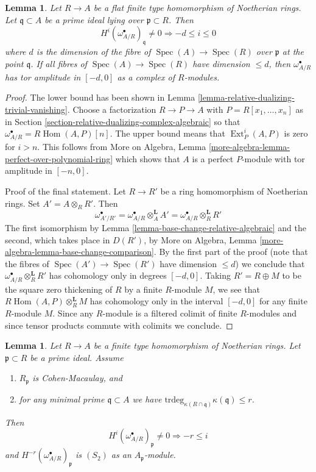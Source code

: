 \documentclass{stacks-project}
\theoremstyle{plain}
\newtheorem{lemma}[subsection]{Lemma}
\theoremstyle{definition}
\theoremstyle{remark}
\numberwithin{equation}{subsection}
\def\Spec{\mathop{\mathrm{Spec}}}
\def\Hom{\mathop{\mathrm{Hom}}\nolimits}
\def\Ext{\mathop{\mathrm{Ext}}\nolimits}
\begin{document}
\begin{lemma}
\label{lemma-relative-dualizing-flat-vanishing}
Let $R \to A$ be a flat finite type homomorphism of Noetherian rings.
Let $\mathfrak q \subset A$ be a prime ideal lying over
$\mathfrak p \subset R$. Then
$$
H^i(\omega_{A/R}^\bullet)_\mathfrak q \not = 0
\Rightarrow - d \leq i \leq 0
$$
where $d$ is the dimension of the fibre of $\Spec(A) \to \Spec(R)$
over $\mathfrak p$ at the point $\mathfrak q$. If all fibres of
$\Spec(A) \to \Spec(R)$ have dimension $\leq d$, then
$\omega_{A/R}^\bullet$ has tor amplitude in $[-d, 0]$
as a complex of $R$-modules.
\end{lemma}

\begin{proof}
The lower bound has been shown in
Lemma \ref{lemma-relative-dualizing-trivial-vanishing}.
Choose a factorization $R \to P \to A$ with $P = R[x_1, \ldots, x_n]$
as in Section \ref{section-relative-dualizing-complex-algebraic}
so that $\omega_{A/R}^\bullet = R\Hom(A, P)[n]$.
The upper bound means that $\Ext^i_P(A, P)$ is zero for $i > n$.
This follows from
More on Algebra, Lemma \ref{more-algebra-lemma-perfect-over-polynomial-ring}
which shows that $A$ is a perfect $P$-module with
tor amplitude in $[-n, 0]$.

\medskip\noindent
Proof of the final statement. Let $R \to R'$ be a ring homomorphism
of Noetherian rings. Set $A' = A \otimes_R R'$. Then
$$
\omega_{A'/R'}^\bullet =
\omega_{A/R}^\bullet \otimes_A^\mathbf{L} A' =
\omega_{A/R}^\bullet \otimes_R^\mathbf{L} R'
$$
The first isomorphism by Lemma \ref{lemma-base-change-relative-algebraic}
and the second, which takes place in $D(R')$, by
More on Algebra, Lemma \ref{more-algebra-lemma-base-change-comparison}.
By the first part of the proof
(note that the fibres of $\Spec(A') \to \Spec(R')$ have dimension $\leq d$)
we conclude that $\omega_{A/R}^\bullet \otimes_R^\mathbf{L} R'$
has cohomology only in degrees $[-d, 0]$. Taking $R' = R \oplus M$
to be the square zero thickening of $R$ by a finite $R$-module $M$,
we see that $R\Hom(A, P) \otimes_R^\mathbf{L} M$
has cohomology only in the interval $[-d, 0]$ for any finite $R$-module $M$.
Since any $R$-module is a filtered colimit of finite $R$-modules
and since tensor products commute with colimits we conclude.
\end{proof}

\begin{lemma}
\label{lemma-relative-dualizing-CM-vanishing}
Let $R \to A$ be a finite type homomorphism of Noetherian rings.
Let $\mathfrak p \subset R$ be a prime ideal. Assume
\begin{enumerate}
\item $R_\mathfrak p$ is Cohen-Macaulay, and
\item for any minimal prime $\mathfrak q \subset A$ we have
$\text{trdeg}_{\kappa(R \cap \mathfrak q)} \kappa(\mathfrak q) \leq r$.
\end{enumerate}
Then
$$
H^i(\omega_{A/R}^\bullet)_\mathfrak p \not = 0 \Rightarrow - r \leq i
$$
and $H^{-r}(\omega_{A/R}^\bullet)_\mathfrak p$ is $(S_2)$
as an $A_\mathfrak p$-module.
\end{lemma}
\end{document}
